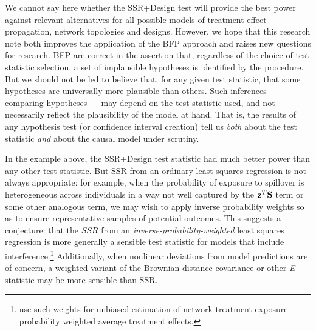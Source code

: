 We cannot say here whether the SSR+Design test will provide the best power
against relevant alternatives for all possible models of treatment effect
propagation, network topologies and designs. However, we hope that this
research note both improves the application of the BFP approach and raises new
questions for research.  BFP are correct in the assertion that, regardless of
the choice of test statistic selection, a set of implausible hypotheses is
identified by the procedure. But we should not be led to believe that, for any
given test statistic, that some hypotheses are universally more plausible than others.
Such inferences --- comparing hypotheses --- may depend on the test statistic
used, and not necessarily reflect the plausibility of the model at hand. That
is, the results of any hypothesis test (or confidence interval creation) tell
us \emph{both} about the test statistic \emph{and} about the causal model under scrutiny.

In the example above, the SSR+Design test statistic had much better power than
any other test statistic. But SSR from an ordinary least squares regression is
not always appropriate: for example, when the probability of exposure to
spillover is heterogeneous across individuals in a way not well captured by the
$\mathbf{z}^T \mathbf{S}$ term or some other analogous term, we may wish to apply inverse
probability weights so as to ensure representative samples of potential
outcomes. This suggests a conjecture: that the $SSR$ from an {\it
  inverse-probability-weighted} least squares regression is more generally a
sensible test statistic for models that include
interference.\footnote{\citet{aronowsamii2012interfere} use such weights for
  unbiased estimation of network-treatment-exposure probability weighted
  average treatment effects.}  Additionally, when nonlinear deviations from
model predictions are of concern, a weighted variant of the Brownian distance
covariance \cite{szekely2009brownian} or other {\it E}-statistic may be more
sensible than SSR.


